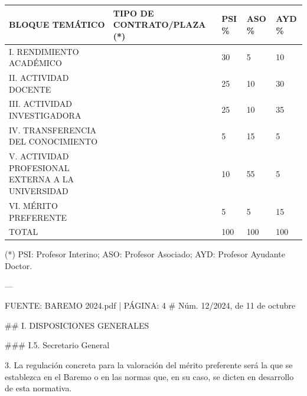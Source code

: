 \documentclass{article}
\begin{document}
\begin{itemize}
\begin{itemize}
\begin{scriptsize}
                  \vspace{0.4cm}
                  \begin{table}[h!]\centering\renewcommand{\arraystretch}{1.3}
                    \begin{tabular}{|p{}|p{}|p{}|p{}|p{}|}\hline
                      BLOQUE TEMÁTICO                                   & TIPO DE CONTRATO/PLAZA (*) & PSI \% & ASO \% & AYD \% \\\hline
                      I. RENDIMIENTO ACADÉMICO                          &                            & 30     & 5      & 10     \\\hline
                      II. ACTIVIDAD DOCENTE                             &                            & 25     & 10     & 30     \\\hline
                      III. ACTIVIDAD INVESTIGADORA                      &                            & 25     & 10     & 35     \\\hline
                      IV. TRANSFERENCIA DEL CONOCIMIENTO                &                            & 5      & 15     & 5      \\\hline
                      V. ACTIVIDAD PROFESIONAL EXTERNA A LA UNIVERSIDAD &                            & 10     & 55     & 5      \\\hline
                      VI. MÉRITO PREFERENTE                             &                            & 5      & 5      & 15     \\\hline
                      TOTAL                                             &                            & 100    & 100    & 100    \\\hline
                    \end{tabular}\end{table}
                  \vspace{0.4cm}

                  (*) PSI: Profesor Interino; ASO: Profesor Asociado; AYD: Profesor Ayudante Doctor.

                  ---

                  FUENTE: BAREMO 2024.pdf | PÁGINA: 4
                  \# Núm. 12/2024, de 11 de octubre

                  \#\# I. DISPOSICIONES GENERALES

                  \#\#\# I.5. Secretario General

                  3. La regulación concreta para la valoración del mérito preferente será la que se establezca en el Baremo o en las normas que, en su caso, se dicten en desarrollo de esta normativa.


\end{scriptsize}
\end{itemize}
\end{itemize}
\end{document}
